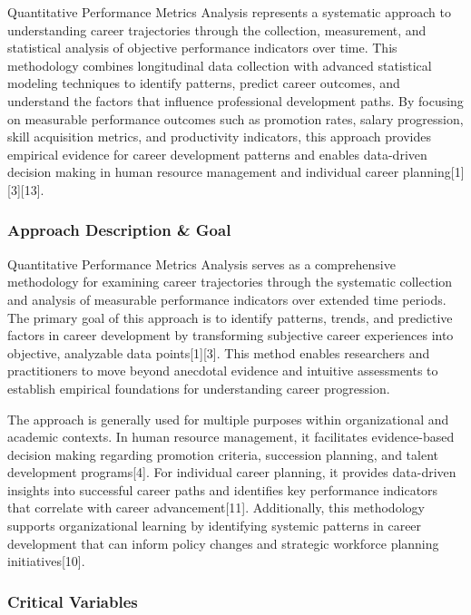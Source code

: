 \documentclass[main.tex]{subfiles}
\begin{document}
Quantitative Performance Metrics Analysis represents a systematic approach to understanding career trajectories through the collection, measurement, and statistical analysis of objective performance indicators over time. This methodology combines longitudinal data collection with advanced statistical modeling techniques to identify patterns, predict career outcomes, and understand the factors that influence professional development paths. By focusing on measurable performance outcomes such as promotion rates, salary progression, skill acquisition metrics, and productivity indicators, this approach provides empirical evidence for career development patterns and enables data-driven decision making in human resource management and individual career planning[1][3][13].

\subsubsection{Approach Description \& Goal}

Quantitative Performance Metrics Analysis serves as a comprehensive methodology for examining career trajectories through the systematic collection and analysis of measurable performance indicators over extended time periods. The primary goal of this approach is to identify patterns, trends, and predictive factors in career development by transforming subjective career experiences into objective, analyzable data points[1][3]. This method enables researchers and practitioners to move beyond anecdotal evidence and intuitive assessments to establish empirical foundations for understanding career progression.

The approach is generally used for multiple purposes within organizational and academic contexts. In human resource management, it facilitates evidence-based decision making regarding promotion criteria, succession planning, and talent development programs[4]. For individual career planning, it provides data-driven insights into successful career paths and identifies key performance indicators that correlate with career advancement[11]. Additionally, this methodology supports organizational learning by identifying systemic patterns in career development that can inform policy changes and strategic workforce planning initiatives[10].

\subsubsection{Critical Variables}
\end{document}
